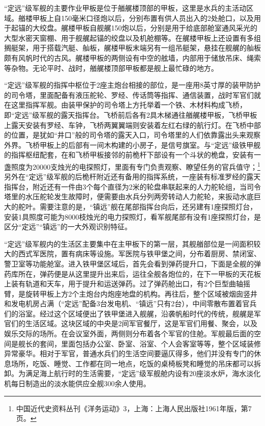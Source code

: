 \documentclass[12pt,UTF8]{ctexbook}
\begin{document}
“定远”级军舰的主要作业甲板是位于艏艉楼顶部的甲板，这里是水兵的主活动区域。艏楼甲板上自150毫米口径炮以后，分别布置有供人员出入的2处舱口，以及用于起锚的大绞盘。艉楼甲板自舰艉150炮以后，分别是用于给底部舱室通风采光的大型水密天窗棚、用于舰艉起锚的绞盘以及机舱棚等。在艉楼甲板上还设置有多组搁艇架，用于搭载汽艇、舢板，艉楼甲板末端另有一组吊艇架，悬挂在舰艉的舢板颇有风帆时代的古风。艉楼甲板的两侧设有中空的舷墙，内部用于储放吊床、绳索等杂物。无论平时、战时，艏艉楼顶部甲板都是舰上最忙碌的地方。

“定远”级军舰的指挥中枢位于2座主炮台相接的部位，是一座用8英寸厚的装甲防护的司令塔，里面配备有液压舵轮、罗经、传话筒等指挥、通信装置，战时军官们就在这里指挥军舰。由装甲保护的司令塔上方托举着一个铁、木材料构成飞桥，即“定远”级军舰的露天指挥台。飞桥前后各有2具木梯通往艏艉楼甲板，飞桥甲板上露天安装有罗经、车钟，飞桥两翼翼端则安装着左红右绿的航行灯。在飞桥中部的位置，是犹如“井口”般的司令塔的露天入口，司令塔里的人们依靠露出头来观察外界。飞桥甲板上的后部有一间木构建的小房子，是信号旗室。与“定远”级铁甲舰的指挥枢纽配套，在和飞桥甲板接邻的前桅杆下部设有一个斗状的桅盘，安装有一盏照度为20000支烛光的电探照灯，里面有专门负责观察、瞭望任务的官兵值守；\footnote{中国近代史资料丛刊《洋务运动》3，上海：上海人民出版社1961年版，第7页。}另外在“定远”级军舰的后桅杆附近还有备用的指挥系统，一座装有标准罗经的露天指挥台，附近还有一件由3个每个直径为2米的轮盘串联起来的人力舵轮组，当司令塔里的水压舵轮发生故障时，便需要由水兵分列两旁转动人力舵轮，来扳动水底巨大的舵叶。需要注意的是，“镇远”舰在尾部指挥台向后，还另建有1座探照灯台，安装1具照度可能为8000枝烛光的电力探照灯，看军舰尾部有没有1座探照灯台，是区分“定远”“镇远”的一大外观识别特征。

“定远”级军舰内的生活区主要集中在主甲板下的第一层，其舰艏部位是一间面积较大的西式军医院，置有病床等设施。军医院与铁甲堡之间，分布着厨房、禁闭室、警卫室等功能舱室。进入铁甲堡区域后，首先会看到弹药提升口，下面是全舰的弹药库所在，弹药便是从这里提升出来后，运往全舰各炮位的，在下一甲板的天花板上装有轨道和天车，用于提升和运送弹药。过了弹药舱出口，有2个巨型曲轴摇臂，是旋转甲板上方2个主炮台内炮座地盘的机构。再往后，整个区域被烟囱竖井和发电机房占满（“定远”配备3台发电机、“镇远”只有2台），中间零散布置着官兵们的浴室。经过这个区域便出了铁甲堡进入舰艉，沿袭帆船时代的传统，舰艉是军官们的生活区域。这块区域的中央是2间军官餐厅，这是军官们用餐、聚会，以及娱乐交际的场所。在会议室外面，两侧则分布着各个军官的住舱。军舰最后面的空间是舰长的套间，里面包括办公室、卧室、浴室、个人会客室等等，整个区域装修异常豪华。相对于军官，普通水兵们的生活空间要逼仄得多，他们并没有专门的休息场所，吃饭、睡觉、工作都在同一地点，吃饭的桌椅板凳和睡觉的吊床都可以拆卸。为满足海上航行时的生活需要，“定远”级军舰舱内设有20座淡水炉，海水淡化机每日制造出的淡水能供应全舰300余人使用。
\end{document}
